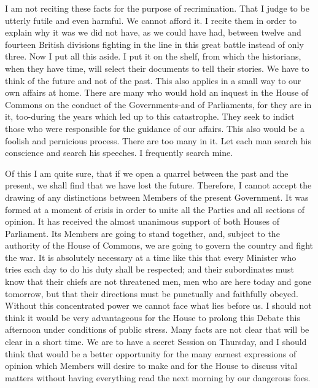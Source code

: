 \documentclass[a4paper]{amsbook}
\begin{document}
I am not reciting these facts for the purpose of recrimination. That I judge to be utterly futile and even harmful. We cannot afford it. I recite them in order to explain why it was we did not have, as we could have had, between twelve and fourteen British divisions fighting in the line in this great battle instead of only three. Now I put all this aside. I put it on the shelf, from which the historians, when they have time, will select their documents to tell their stories. We have to think of the future and not of the past. This also applies in a small way to our own affairs at home. There are many who would hold an inquest in the House of Commons on the conduct of the Governments-and of Parliaments, for they are in it, too-during the years which led up to this catastrophe. They seek to indict those who were responsible for the guidance of our affairs. This also would be a foolish and pernicious process. There are too many in it. Let each man search his conscience and search his speeches. I frequently search mine.

Of this I am quite sure, that if we open a quarrel between the past and the present, we shall find that we have lost the future. Therefore, I cannot accept the drawing of any distinctions between Members of the present Government. It was formed at a moment of crisis in order to unite all the Parties and all sections of opinion. It has received the almost unanimous support of both Houses of Parliament. Its Members are going to stand together, and, subject to the authority of the House of Commons, we are going to govern the country and fight the war. It is absolutely necessary at a time like this that every Minister who tries each day to do his duty shall be respected; and their subordinates must know that their chiefs are not threatened men, men who are here today and gone tomorrow, but that their directions must be punctually and faithfully obeyed. Without this concentrated power we cannot face what lies before us. I should not think it would be very advantageous for the House to prolong this Debate this afternoon under conditions of public stress. Many facts are not clear that will be clear in a short time. We are to have a secret Session on Thursday, and I should think that would be a better opportunity for the many earnest expressions of opinion which Members will desire to make and for the House to discuss vital matters without having everything read the next morning by our dangerous foes.
\end{document}
